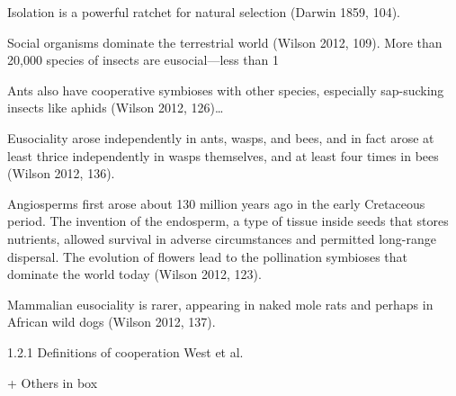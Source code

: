 \documentclass{tufte-book} %
\begin{document}
Isolation is a powerful ratchet for natural selection (Darwin 1859, 104).

Social organisms dominate the terrestrial world (Wilson 2012, 109). More than 20,000 species of insects are eusocial—less than 1%

Ants also have cooperative symbioses with other species, especially sap-sucking insects like aphids (Wilson 2012, 126)…

Eusociality arose independently in ants, wasps, and bees, and in fact arose at least thrice independently in wasps themselves, and at least four times in bees (Wilson 2012, 136). 

Angiosperms first arose about 130 million years ago in the early Cretaceous period. The invention of the endosperm, a type of tissue inside seeds that stores nutrients, allowed survival in adverse circumstances and permitted long-range dispersal. The evolution of flowers lead to the pollination symbioses that dominate the world today (Wilson 2012, 123).

Mammalian eusociality is rarer, appearing in naked mole rats and perhaps in African wild dogs (Wilson 2012, 137).  


1.2.1 Definitions of cooperation
West et al. 

+ Others in box
\end{document}
